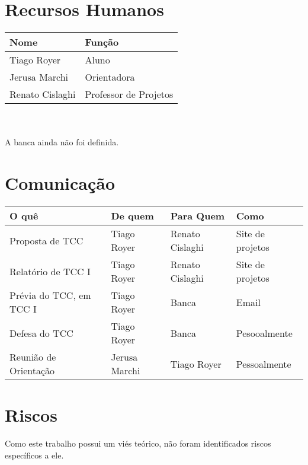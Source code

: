 \documentclass[12pt]{article}
\begin{document}
\section{Recursos Humanos}
    \begin{tabular}{l l}
        \hline
        Nome            & Função \\
        \hline
        Tiago Royer     & Aluno \\
        Jerusa Marchi   & Orientadora \\
        Renato Cislaghi & Professor de Projetos \\
        \hline
    \end{tabular}
    \\
    \\
    A banca ainda não foi definida.

\section{Comunicação}
    \begin{tabular}{l l l l}
        \hline
        O quê                   & De quem       & Para Quem         & Como \\
        \hline
        Proposta de TCC         & Tiago Royer   & Renato Cislaghi   & Site de projetos \\
        Relatório de TCC I      & Tiago Royer   & Renato Cislaghi   & Site de projetos \\
        Prévia do TCC, em TCC I & Tiago Royer   & Banca             & Email \\
        Defesa do TCC           & Tiago Royer   & Banca             & Pesooalmente \\
        Reunião de Orientação   & Jerusa Marchi & Tiago Royer       & Pessoalmente \\
        \hline
    \end{tabular}

\section{Riscos}
    Como este trabalho possui um viés teórico, não foram identificados
    riscos específicos a ele.



\end{document}
